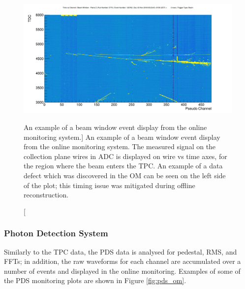 \begin{figure}

	\centering

	\includegraphics[width=\textwidth]{figures/beam_evd.png}

	\caption
	[An example of a beam window event display from the \protodune{} online
	monitoring system.]
	{An example of a beam window event display from the \protodune{} online
	monitoring system. The measured signal on the collection plane wires in ADC 
	is displayed on wire vs time axes, for the region where the beam enters the 
	TPC. An example of a data defect which was discovered in the OM can be seen 
	on the left side of the plot; this timing issue was mitigated during offline
	reconstruction.}

	\label{fig:beam_evd}

\end{figure}

\subsubsection*{Photon Detection System}
Similarly to the TPC data, the PDS data is analysed for pedestal, RMS, and FFTs;
in addition, the raw waveforms for each channel are accumulated over a number of
events and displayed in the online monitoring. Examples of some of the PDS 
monitoring plots are shown in Figure \ref{fig:pds_om}.

